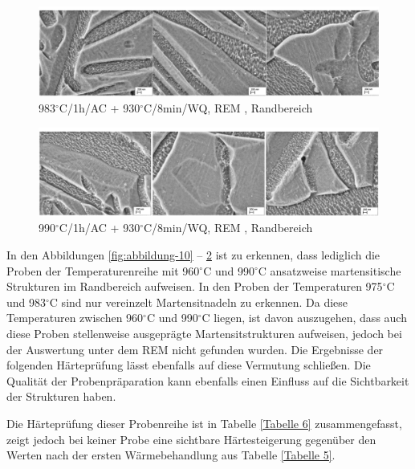 \begin{figure}
	\centering
	\includegraphics[width=1.0\linewidth]{./Bilder/Abbildung 12.png}
	\caption[Abbildung 12]{983$^\circ$C/1h/AC + 930$^\circ$C/8min/WQ, REM , Randbereich}
	\label{fig:abbildung-12}
\end{figure}

\begin{figure}
	\centering
	\includegraphics[width=1.0\linewidth]{./Bilder/Abbildung 13.png}
	\caption[Abbildung 13]{990$^\circ$C/1h/AC + 930$^\circ$C/8min/WQ, REM , Randbereich}
	\label{fig:abbildung-13}
\end{figure}

\pagebreak

In den Abbildungen \ref{fig:abbildung-10} -- \ref{fig:abbildung-13} ist zu erkennen, dass lediglich die Proben der Temperaturenreihe mit 960$^\circ$C und 990$^\circ$C ansatzweise martensitische Strukturen im Randbereich aufweisen. In den Proben der Temperaturen 975$^\circ$C und 983$^\circ$C sind nur vereinzelt Martensitnadeln zu erkennen. Da diese Temperaturen zwischen 960$^\circ$C und 990$^\circ$C liegen, ist davon auszugehen, dass auch diese Proben stellenweise ausgeprägte Martensitstrukturen aufweisen, jedoch bei der Auswertung unter dem REM nicht gefunden wurden. Die Ergebnisse der folgenden Härteprüfung lässt ebenfalls auf diese Vermutung schließen. Die Qualität der Probenpräparation kann ebenfalls einen Einfluss auf die Sichtbarkeit der Strukturen haben.

Die Härteprüfung dieser Probenreihe ist in Tabelle \ref{Tabelle 6} zusammengefasst, zeigt jedoch bei keiner Probe eine sichtbare Härtesteigerung gegenüber den Werten nach der ersten Wärmebehandlung aus Tabelle \ref{Tabelle 5}.

